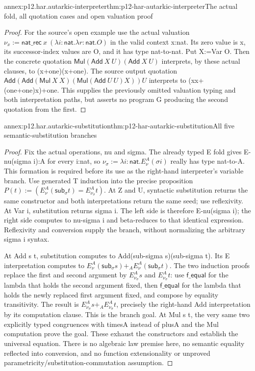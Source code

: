 \begin{annexitem}{annex:p12.har.autarkic-interpreter}{thm:p12-har-autarkic-interpreter}{The actual fold, all quotation cases and open valuation proof}
\begin{proof}
For the source's open example use the actual valuation
\(\nu_x:=\mathsf{nat\_rec}\ x\
(\lambda i:\mathsf{nat}.\lambda r:\mathsf{nat}.O)\)
in the valid context x:nat. Its zero value is x, its successor-index
values are O, and it has type nat-to-nat. Put X:=Var O.
Then the concrete quotation
\(\mathsf{Mul}(\mathsf{Add}\ X\ U)(\mathsf{Add}\ X\ U)\)
interprets, by these actual clauses, to (x+one)(x+one).
The source output quotation
\(\mathsf{Add}(\mathsf{Add}(\mathsf{Mul}\ X\ X)
(\mathsf{Mul}(\mathsf{Add}\ U\ U)X))U\)
interprets to (xx+(one+one)x)+one. This supplies the previously
omitted valuation typing and both interpretation paths, but asserts
no program G producing the second quotation from the first.
\end{proof}
\end{annexitem}

\begin{annexitem}{annex:p12.har.autarkic-substitution}{thm:p12-har-autarkic-substitution}{All five semantic-substitution branches}
\begin{proof}
Fix the actual operations, nu and sigma. The already typed E fold
gives E-nu(sigma i):A for every i:nat, so
\(\nu_\sigma:=\lambda i:\mathsf{nat}.E_\nu^A(\sigma i)\)
really has type nat-to-A. This formation is required before its use
as the right-hand interpreter's variable branch.
Use generated T induction into the precise proposition
\(P(t):=(E_\nu^A(\mathsf{sub}_\sigma t)=E_{\nu_\sigma}^A t)\).
At Z and U, syntactic substitution returns the same constructor and
both interpretations return the same seed; use reflexivity.
At Var i, substitution returns sigma i. The left side is therefore
E-nu(sigma i); the right side computes to nu-sigma i and beta-reduces
to that identical expression. Reflexivity and conversion supply the
branch, without normalizing the arbitrary sigma i syntax.

At Add s t, substitution computes to
Add(sub-sigma s)(sub-sigma t). Its E interpretation computes to
\(E_\nu^A(\mathsf{sub}_\sigma s)+_A
E_\nu^A(\mathsf{sub}_\sigma t)\).
The two induction proofs replace the first and second argument by
\(E_{\nu_\sigma}^A s\) and \(E_{\nu_\sigma}^A t\): use \(\mathsf{f\_equal}\)
for the lambda that holds the second argument fixed, then \(\mathsf{f\_equal}\)
for the lambda that holds the newly replaced first argument fixed,
and compose by equality transitivity. The result is
\(E_{\nu_\sigma}^A s+_A E_{\nu_\sigma}^A t\), precisely the
right-hand Add interpretation by its computation clause. This is the
branch goal. At Mul s t, the very same two explicitly typed congruences
with timesA instead of plusA and the Mul computation prove the goal.
These exhaust the constructors and establish the universal equation.
There is no algebraic law premise here, no semantic equality reflected
into conversion, and no function extensionality or unproved
parametricity/substitution-commutation assumption.
\end{proof}
\end{annexitem}
